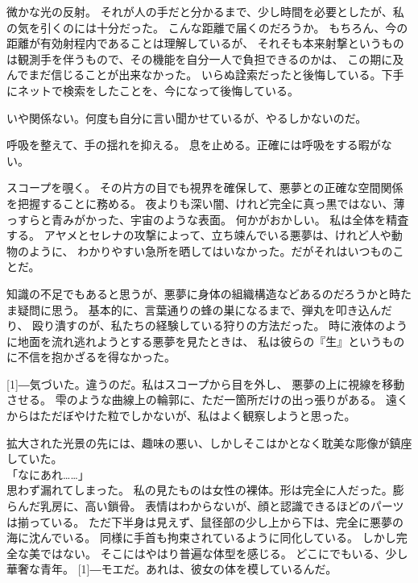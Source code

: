 \documentclass[../IHMain]{subfiles}
\begin{document}
微かな光の反射。
それが人の手だと分かるまで、少し時間を必要としたが、私の気を引くのには十分だった。
こんな距離で届くのだろうか。
もちろん、今の距離が有効射程内であることは理解しているが、
それそも本来射撃というものは観測手を伴うもので、その機能を自分一人で負担できるのかは、
この期に及んでまだ信じることが出来なかった。
いらぬ詮索だったと後悔している。下手にネットで検索をしたことを、今になって後悔している。

いや関係ない。何度も自分に言い聞かせているが、やるしかないのだ。

呼吸を整えて、手の揺れを抑える。
息を止める。正確には呼吸をする暇がない。

スコープを覗く。
その片方の目でも視界を確保して、悪夢との正確な空間関係を把握することに務める。
夜よりも深い闇、けれど完全に真っ黒ではない、薄っすらと青みがかった、宇宙のような表面。
何かがおかしい。
私は全体を精査する。
アヤメとセレナの攻撃によって、立ち竦んでいる悪夢は、けれど人や動物のように、
わかりやすい急所を晒してはいなかった。だがそれはいつものことだ。

知識の不足でもあると思うが、悪夢に身体の組織構造などあるのだろうかと時たま疑問に思う。
基本的に、言葉通りの蜂の巣になるまで、弾丸を叩き込んだり、
殴り潰すのが、私たちの経験している狩りの方法だった。
時に液体のように地面を流れ逃れようとする悪夢を見たときは、
私は彼らの『生』というものに不信を抱かざるを得なかった。

\scalebox{3}[1]{―}気づいた。違うのだ。私はスコープから目を外し、
悪夢の上に視線を移動させる。
雫のような曲線上の輪郭に、ただ一箇所だけの出っ張りがある。
遠くからはただぼやけた粒でしかないが、私はよく観察しようと思った。

拡大された光景の先には、趣味の悪い、しかしそこはかとなく耽美な彫像が鎮座していた。\\
「なにあれ……」\\
思わず漏れてしまった。
私の見たものは女性の裸体。形は完全に人だった。膨らんだ乳房に、高い鎖骨。
表情はわからないが、顔と認識できるほどのパーツは揃っている。
ただ下半身は見えず、鼠径部の少し上から下は、完全に悪夢の海に沈んでいる。
同様に手首も拘束されているように同化している。
しかし完全な美ではない。
そこにはやはり普遍な体型を感じる。
どこにでもいる、少し華奢な青年。
\scalebox{3}[1]{―}モエだ。あれは、彼女の体を模しているんだ。
\end{document}
